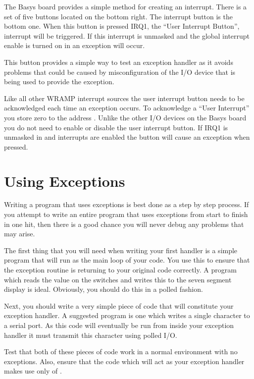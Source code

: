 The Basys board provides a simple method for creating an
interrupt. There is a set of five buttons located on the bottom right.
The interrupt button is the bottom one. When this button is pressed IRQ1,
the ``User Interrupt Button'', interrupt will be triggered. If this
interrupt is unmasked and the global interrupt enable is turned on in
 an exception will occur.

This button provides a simple way to test an exception handler as it
avoids problems that could be caused by misconfiguration of the I/O
device that is being used to provide the exception.

Like all other WRAMP interrupt sources the user interrupt button needs
to be acknowledged each time an exception occurs. To acknowledge a
``User Interrupt'' you store zero to the address
. Unlike the other I/O devices on the Basys board you do
not need to enable or disable the user interrupt button. If IRQ1 is
unmasked in  and interrupts are enabled the button
will cause an exception when pressed.

\section{Using Exceptions}

Writing a program that uses exceptions is best done as a step by step
process. If you attempt to write an entire program that uses exceptions
from start to finish in one hit, then there is a good chance you will never
debug any problems that may arise.

The first thing that you will need when writing your first handler is a
simple program that will run as the main loop of your code. You use this to
ensure that the exception routine is returning to your original code
correctly. A program which reads the value on the switches and writes this
to the seven segment display is ideal. Obviously, you should do this in a
polled fashion.

Next, you should write a very simple piece of code that will constitute
your exception handler. A suggested program is one which writes a
single character to a serial port. As this code will eventually be run
from inside your exception handler it must transmit this character
using polled I/O.

Test that both of these pieces of code work in a normal environment with no
exceptions. Also, ensure that the code which will act as your exception
handler makes use only of .

